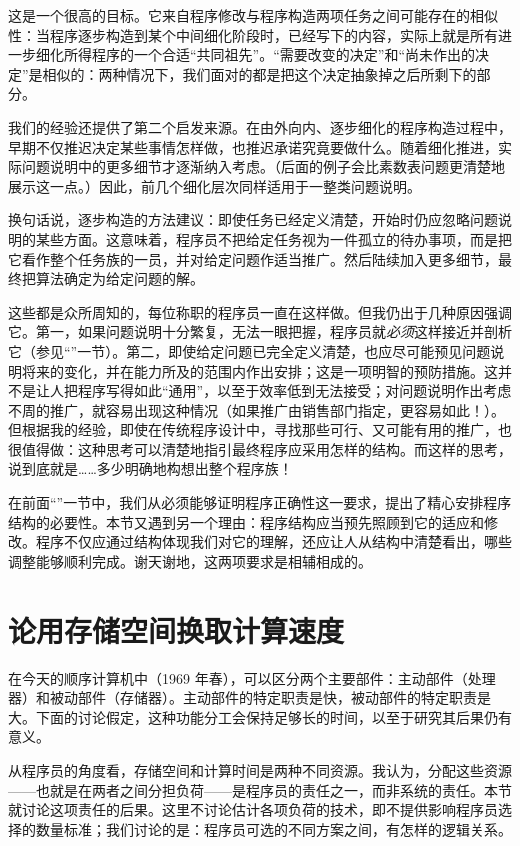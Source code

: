 \documentclass[twoside,11pt,fontset=none]{ctexbook}
\begin{document}
这是一个很高的目标。它来自程序修改与程序构造两项任务之间可能存在的相似性：当程序逐步构造到某个中间细化阶段时，已经写下的内容，实际上就是所有进一步细化所得程序的一个合适“共同祖先”。“需要改变的决定”和“尚未作出的决定”是相似的：两种情况下，我们面对的都是把这个决定抽象掉之后所剩下的部分。

我们的经验还提供了第二个启发来源。在由外向内、逐步细化的程序构造过程中，早期不仅推迟决定某些事情怎样做，也推迟承诺究竟要做什么。随着细化推进，实际问题说明中的更多细节才逐渐纳入考虑。（后面的例子会比素数表问题更清楚地展示这一点。）因此，前几个细化层次同样适用于一整类问题说明。

换句话说，逐步构造的方法建议：即使任务已经定义清楚，开始时仍应忽略问题说明的某些方面。这意味着，程序员不把给定任务视为一件孤立的待办事项，而是把它看作整个任务族的一员，并对给定问题作适当推广。然后陆续加入更多细节，最终把算法确定为给定问题的解。

这些都是众所周知的，每位称职的程序员一直在这样做。但我仍出于几种原因强调它。第一，如果问题说明十分繁复，无法一眼把握，程序员就\textit{必须}这样接近并剖析它（参见“”一节）。第二，即使给定问题已完全定义清楚，也应尽可能预见问题说明将来的变化，并在能力所及的范围内作出安排；这是一项明智的预防措施。这并不是让人把程序写得如此“通用”，以至于效率低到无法接受；对问题说明作出考虑不周的推广，就容易出现这种情况（如果推广由销售部门指定，更容易如此！）。但根据我的经验，即使在传统程序设计中，寻找那些可行、又可能有用的推广，也很值得做：这种思考可以清楚地指引最终程序应采用怎样的结构。而这样的思考，说到底就是……多少明确地构想出整个程序族！

在前面“”一节中，我们从必须能够证明程序正确性这一要求，提出了精心安排程序结构的必要性。本节又遇到另一个理由：程序结构应当预先照顾到它的适应和修改。程序不仅应通过结构体现我们对它的理解，还应让人从结构中清楚看出，哪些调整能够顺利完成。谢天谢地，这两项要求是相辅相成的。

\section[论用存储空间换取计算速度]{论用存储空间换取计算速度}
\label{sec:trading-storage-for-computation-speed}

在今天的顺序计算机中（1969 年春），可以区分两个主要部件：主动部件（处理器）和被动部件（存储器）。主动部件的特定职责是快，被动部件的特定职责是大。下面的讨论假定，这种功能分工会保持足够长的时间，以至于研究其后果仍有意义。

从程序员的角度看，存储空间和计算时间是两种不同资源。我认为，分配这些资源——也就是在两者之间分担负荷——是程序员的责任之一，而非系统的责任。本节就讨论这项责任的后果。这里不讨论估计各项负荷的技术，即不提供影响程序员选择的数量标准；我们讨论的是：程序员可选的不同方案之间，有怎样的逻辑关系。
\end{document}
